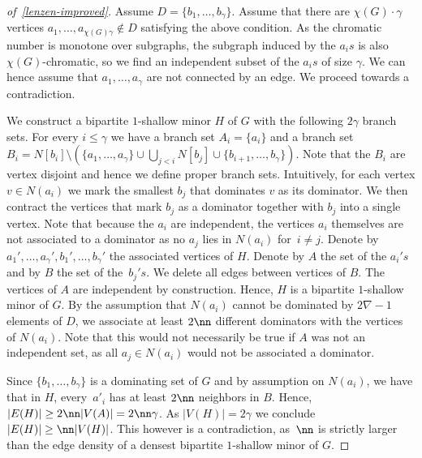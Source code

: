 \begin{proof}[of~\cref{lenzen-improved}]
  Assume $D=\{b_1,\ldots,b_\gamma\}$.  Assume that there are
  $\chi(G)\cdot\gamma$ vertices
  $a_1,\ldots,a_{\chi(G)\gamma}\not\in D$ satisfying the above
  condition. As the chromatic number is monotone over subgraphs, the
  subgraph induced by the $a_is$ is also $\chi(G)$-chromatic, so we
  find an independent subset of the $a_is$ of size $\gamma$. We can
  hence assume that $a_1,\ldots,a_{\gamma}$ are not connected by an
  edge. We proceed towards a contradiction.

  We construct a bipartite $1$-shallow minor $H$ of $G$ with the
  following \mbox{$2\gamma$} branch sets. For every
  \mbox{$i\le \gamma$} we have a branch set $A_i=\{a_i\}$ and a branch
  set
  \mbox{$B_i=N[b_i]\setminus (\{a_1,\ldots, a_{\gamma}\}\cup
    \bigcup_{j<i}N[b_j]\cup \{b_{i+1},\ldots, b_\gamma\})$}. Note that
  the $B_i$ are vertex disjoint and hence we define proper branch
  sets. Intuitively, for each vertex $v\in N(a_i)$ we mark the
  smallest $b_j$ that dominates $v$ as its dominator. We then contract
  the vertices that mark $b_j$ as a dominator together with $b_j$ into
  a single vertex. Note that because the $a_i$ are independent, the
  vertices $a_i$ themselves are not associated to a dominator as no
  $a_j$ lies in $N(a_i)$ for~$i\neq j$.  Denote by
  $a_1',\ldots, a_{\gamma}',b_1',\ldots, b_\gamma'$ the associated
  vertices of $H$. Denote by $A$ the set of the $a_i's$ and by $B$ the
  set of the~$b_j's$.  We delete all edges between vertices of
  $B$. The vertices of $A$ are independent by construction. Hence, $H$
  is a bipartite $1$-shallow minor of $G$.  By the assumption that
  $N(a_i)$ cannot be dominated by $2\nabla-1$ elements of $D$, we
  associate at least $2\nn$ different dominators with the vertices of
  $N(a_i)$. Note that this would not necessarily be true if $A$ was
  not an independent set, as all $a_j\in N(a_i)$ would not be
  associated a dominator.

  Since $\{b_1,\ldots, b_\gamma\}$ is a dominating set of $G$ and by
  assumption on $N(a_i)$, we have that in $H$, every~$a'_i$ has at
  least $2\nn$ neighbors in $B$. Hence,
  $|E(H)| \ge 2\nn|V(A)| = 2\nn\gamma$. As $|V(H)|=2\gamma$ we
  conclude $|E(H)|\ge \nn|V(H)|$. This however is a contradiction,
  as~$\nn$ is strictly larger than the edge density of a densest
  bipartite $1$-shallow minor of $G$.
\end{proof}

\bigskip

